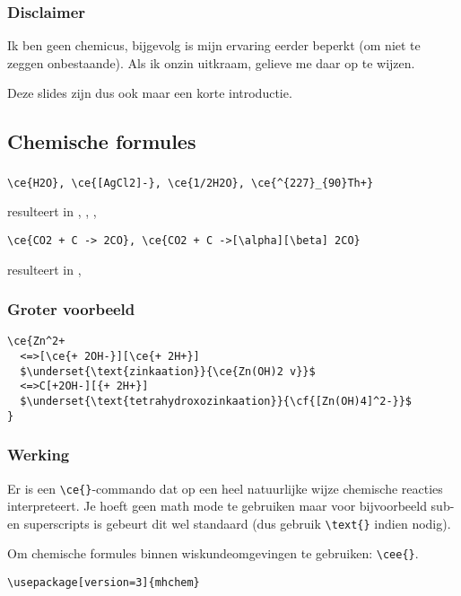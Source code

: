 \begin{frame}
  \frametitle{Disclaimer}

  Ik ben geen chemicus, bijgevolg is mijn ervaring eerder beperkt (om niet te zeggen onbestaande). Als ik onzin uitkraam, gelieve me daar op te wijzen.

  Deze slides zijn dus ook maar een korte introductie.
\end{frame}

\subsection{Chemische formules}
\begin{frame}[fragile]
  \frametitle{}

  \begin{verbatim}
\ce{H2O}, \ce{[AgCl2]-}, \ce{1/2H2O}, \ce{^{227}_{90}Th+}
  \end{verbatim}
  resulteert in , \ce{[AgCl2]-}, , 
  \begin{verbatim}
\ce{CO2 + C -> 2CO}, \ce{CO2 + C ->[\alpha][\beta] 2CO}
  \end{verbatim}
  resulteert in , 
\end{frame}

\begin{frame}[fragile]
  \frametitle{Groter voorbeeld}

  \begin{verbatim}
\ce{Zn^2+
  <=>[\ce{+ 2OH-}][\ce{+ 2H+}]
  $\underset{\text{zinkaation}}{\ce{Zn(OH)2 v}}$
  <=>C[+2OH-][{+ 2H+}]
  $\underset{\text{tetrahydroxozinkaation}}{\cf{[Zn(OH)4]^2-}}$
}
  \end{verbatim}
\end{frame}

\begin{frame}[fragile]
  \frametitle{Werking}

  Er is een \verb|\ce{}|-commando dat op een heel natuurlijke wijze chemische reacties interpreteert. Je hoeft geen math mode te gebruiken maar voor bijvoorbeeld sub- en superscripts is gebeurt dit wel standaard (dus gebruik \verb|\text{}| indien nodig).

  Om chemische formules binnen wiskundeomgevingen te gebruiken: \verb|\cee{}|.

  \begin{verbatim}
\usepackage[version=3]{mhchem}
  \end{verbatim}
\end{frame}


